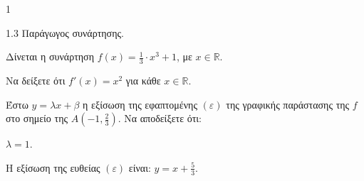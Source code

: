 \begin{ylh}{1}
    \item 1.3 Παράγωγος συνάρτησης.
\end{ylh}
Δίνεται η συνάρτηση $f(x) = \frac{1}{3} \cdot x^3 + 1$, με $x \in \mathbb{R}$.

\begin{alist}
    \item Να δείξετε ότι $f'(x) = x^2$ για κάθε $x \in \mathbb{R}$. 

    Έστω $y = \lambda x + \beta$ η εξίσωση της εφαπτομένης $(\varepsilon)$ της γραφικής παράστασης της $f$ στο σημείο της $A\left(-1, \frac{2}{3}\right)$. Να αποδείξετε ότι:
    \item $\lambda = 1$. 
    \item Η εξίσωση της ευθείας $(\varepsilon)$ είναι: $y = x + \frac{5}{3}$. 
\end{alist}

